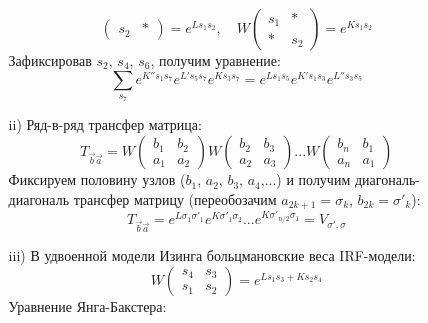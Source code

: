 \documentclass[12pt]{article}
\theoremstyle{definition}
\begin{document}
\begin{enumerate}
\begin{itemize}
\begin{equation}
\begin{pmatrix}
                s_2 & *
            \end{pmatrix}=e^{Ls_1s_2},\quad W\begin{pmatrix}
                s_1 & *\\
                * & s_2
            \end{pmatrix}=e^{Ks_1s_2}
        \end{equation}
        Зафиксировав $s_2$, $s_4$, $s_6$, получим уравнение:
        \begin{equation}
            \boxed{\sum\limits_{s_7}e^{K''s_1s_7}e^{L's_5s_7}e^{Ks_3s_7}=e^{Ls_1s_5}e^{K's_1s_3}e^{L''s_3s_5}}
        \end{equation}
        \item[ii)] Ряд-в-ряд трансфер матрица:
        \begin{equation}
            T_{\vec{b}\vec{a}}=W\begin{pmatrix}
                b_1 & b_2\\
                a_1 & a_2
            \end{pmatrix}W\begin{pmatrix}
                b_2 & b_3\\
                a_2 & a_3
            \end{pmatrix}...W\begin{pmatrix}
                b_n & b_1\\
                a_n & a_1
            \end{pmatrix}
        \end{equation}
        Фиксируем половину узлов ($b_1$, $a_2$, $b_3$, $a_4$,...) и получим диагональ-диагональ трансфер матрицу (переобозачим $a_{2k+1}=\sigma_k$, $b_{2k}=\sigma'_k$):
        \begin{equation}
            \boxed{T_{\vec{b}\vec{a}}=e^{L\sigma_1\sigma'_1}e^{K\sigma'_1\sigma_2}...e^{K\sigma'_{n/2}\sigma_1}=V_{\sigma',\sigma}}
        \end{equation}
        \item[iii)] В удвоенной модели Изинга больцмановские веса IRF-модели:
        \begin{equation}
            W\begin{pmatrix}
                s_4 & s_3\\
                s_1 & s_2
            \end{pmatrix}=e^{Ls_1s_3+Ks_2s_4}
        \end{equation}
        Уравнение Янга-Бакстера:
        \begin{equation}

\end{equation}
\end{itemize}
\end{enumerate}
\end{document}
